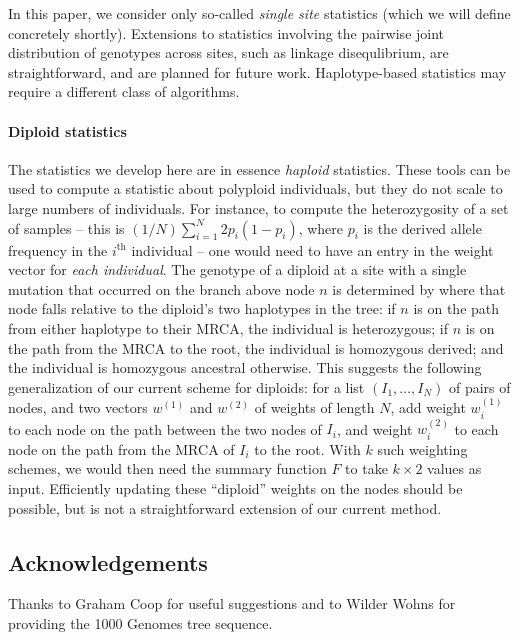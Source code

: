 \documentclass{article}
\begin{document}
In this paper,
we consider only so-called \emph{single site} statistics
(which we will define concretely shortly).
Extensions to statistics involving the pairwise joint distribution of genotypes across sites,
such as linkage disequlibrium,
are straightforward, and are planned for future work.
Haplotype-based statistics may require a different class of algorithms.


\paragraph{Diploid statistics}
The statistics we develop here are in essence \emph{haploid} statistics.
These tools can be used to compute a statistic about polyploid individuals,
but they do not scale to large numbers of individuals.
For instance, to compute the heterozygosity of a set of samples
-- this is $(1/N) \sum_{i=1}^N 2 p_i (1-p_i)$, where $p_i$ is the derived allele frequency
in the $i^\text{th}$ individual --
one would need to have an entry in the weight vector for \emph{each individual}.
The genotype of a diploid at a site with a single mutation that occurred on the branch above node $n$
is determined by where that node falls relative to the diploid's two haplotypes in the tree:
if $n$ is on the path from either haplotype to their MRCA, the individual is heterozygous;
if $n$ is on the path from the MRCA to the root, the individual is homozygous derived;
and the individual is homozygous ancestral otherwise.
This suggests the following generalization of our current scheme for diploids:
for a list $(I_1, \ldots, I_N)$ of pairs of nodes,
and two vectors $w^{(1)}$ and $w^{(2)}$ of weights of length $N$,
add weight $w^{(1)}_i$ to each node on the path between the two nodes of $I_i$,
and weight $w^{(2)}_i$ to each node on the path from the MRCA of $I_i$ to the root.
With $k$ such weighting schemes, we would then need the summary function $F$
to take $k \times 2$ values as input.
Efficiently updating these ``diploid'' weights on the nodes should be possible,
but is not a straightforward extension of our current method.




\subsection*{Acknowledgements}
Thanks to Graham Coop for useful suggestions
and to Wilder Wohns for providing the 1000 Genomes tree sequence.



\end{document}
